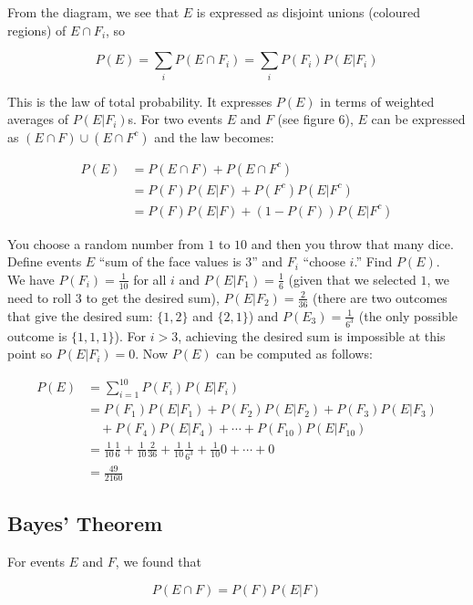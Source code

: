 From the diagram, we see that $E$ is expressed as disjoint unions (coloured regions) of $E \cap F_i$, so

$$P(E)=\sum_i P(E \cap F_i) = \sum_i P(F_i) P(E|F_i)$$

This is the law of total probability. It expresses $P(E)$ in terms of weighted averages of $P(E|F_i)$s. For two events $E$ and $F$ (see figure 6), $E$ can be expressed as $(E\cap F) \cup (E\cap F^c)$ and the law becomes:

\begin{align*}
	P(E)&=P(E \cap F)+P(E \cap F^c) \\
	&=P(F) P(E|F) + P(F^c) P(E|F^c) \\
	&=P(F) P(E|F) + (1-P(F)) P(E|F^c)
\end{align*}

\begin{texample}
	You choose a random number from $1$ to $10$ and then you throw that many dice. Define events $E$ ``sum of the face values is $3$'' and $F_i$ ``choose $i$.'' Find $P(E)$. \\
	
	We have $P(F_i)=\frac{1}{10}$ for all $i$ and $P(E|F_1)=\frac16$ (given that we selected $1$, we need to roll $3$ to get the desired sum), $P(E|F_2)=\frac{2}{36}$ (there are two outcomes that give the desired sum: $\{1,2\}$ and $\{2,1\}$) and $P(E_3)=\frac{1}{6^3}$ (the only possible outcome is $\{1,1,1\}$). For $i>3$, achieving the desired sum is impossible at this point so $P(E|F_i)=0$. Now $P(E)$ can be computed as follows:
	
	\begin{align*}
		P(E)&=\sum_{i=1}^{10} P(F_i) P(E|F_i) \\
		&=P(F_1)P(E|F_1)+P(F_2)P(E|F_2)+P(F_3)P(E|F_3) \\
		&\quad +P(F_4)P(E|F_4)+\cdots+P(F_{10})P(E|F_{10}) \\
		&=\frac{1}{10}\frac16 + \frac{1}{10}\frac{2}{36}+\frac{1}{10}\frac{1}{6^3}+\frac{1}{10}0+\cdots+0 \\
		&=\frac{49}{2160}
	\end{align*}
\end{texample}

\subsection{Bayes' Theorem}

For events $E$ and $F$, we found that

$$P(E \cap F)=P(F)P(E|F)$$

